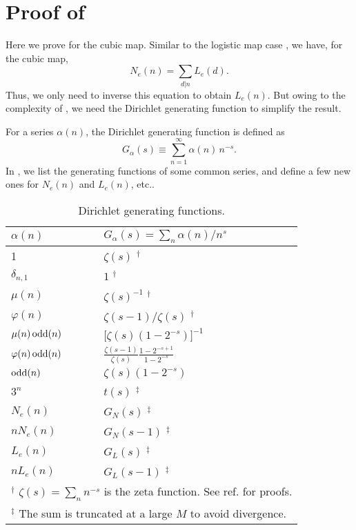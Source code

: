 \documentclass[twocolumn]{revtex4-1}
\begin{document}
\section{\label{apd:cublyndon}Proof of }

Here we prove  
  for the cubic map.
%
Similar to the logistic map case ,
  we have, for the cubic map,
\[
  N_e(n) = \sum_{d|n} L_e(d).
\]
Thus, we only need to inverse this equation to obtain $L_e(n)$.
But owing to the complexity of ,
  we need the Dirichlet generating function
  to simplify the result.

For a series $\alpha(n)$,
the Dirichlet generating function is defined as
\[
    G_\alpha(s) \equiv \sum_{n=1}^\infty \alpha(n) \, n^{-s}.
\]
In , we list the generating functions of
some common series,
and define a few new ones for $N_e(n)$ and $L_e(n)$, etc..





\begin{table}[h]\footnotesize
  \caption{Dirichlet generating functions.}
\begin{center}
\begin{tabular}{ll}
\hline
$\alpha(n)$   &   $G_\alpha(s) = \sum_{n} \alpha(n)/n^{s}$
\\
\hline
1
\qquad \qquad \qquad \qquad \qquad \qquad \qquad
  & $\zeta(s)$ $^\dagger$
\\
$\delta_{n,1}$         & $1$ $^\dagger$
\\
$\mu(n)$    & $\zeta(s)^{-1}$ $^\dagger$
\\
$\varphi(n)$   & $\zeta(s-1)/\zeta(s)$ $^\dagger$
\\
$\mu(n) \, \mathrm{odd}(n)$
  & $\Big[ \zeta(s) (1-2^{-s}) \Big]^{-1}$
\\
$\varphi(n) \, \mathrm{odd}(n)$
  & $\frac{\zeta(s-1)}{\zeta(s)} \frac{1-2^{-s+1}}{1-2^{-s}}$
\\
$\mathrm{odd}(n)$   & $\zeta(s) (1-2^{-s})$
\\
{$3^n$}       & $t(s)$ $^\ddagger$
\\
{$N_e(n)$}      & $G_N(s)$ $^\ddagger$
\\
{$n N_e(n)$}  & $G_N(s-1)$ $^\ddagger$
\\
$L_e(n)$    & $G_L(s)$ $^\ddagger$
\\
$nL_e(n)$   & $G_L(s-1)$ $^\ddagger$
\\
\hline
\multicolumn{2}{p{\linewidth}}{
$^\dagger$
$\zeta(s) = \sum_n n^{-s}$ is the zeta function.
See ref. \cite{hardy} for proofs.
}\\
\multicolumn{2}{p{\linewidth}}{
$^\ddagger$
The sum is truncated at a large $M$ to avoid divergence.
}\\
\hline
\end{tabular}
\end{center}
\label{tab:genfunc}
\end{table}
\end{document}
